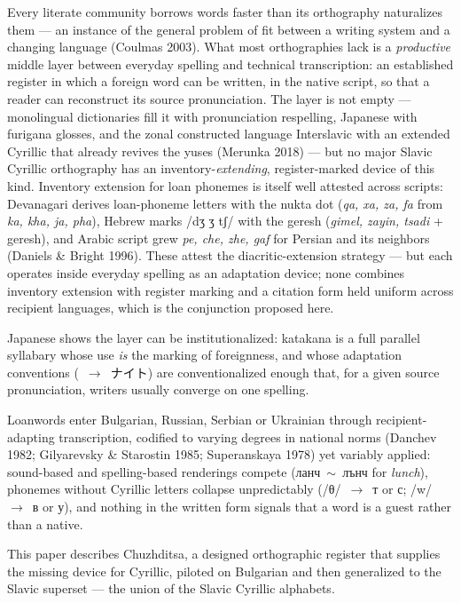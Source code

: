 \documentclass[11pt]{article}
\newcommand{\cz}[1]{{\chu #1}}
\newcommand{\ph}[1]{{\ipafont/#1/}}
\newcommand{\phon}[1]{{\ipafont[#1]}}
\newcommand{\src}[1]{{\ipafont #1}}
\begin{document}
Every literate community borrows words faster than its orthography naturalizes them — an instance of the general problem of fit between a writing system and a changing language (Coulmas 2003). What most orthographies lack is a \emph{productive} middle layer between everyday spelling and technical transcription: an established register in which a foreign word can be written, in the native script, so that a reader can reconstruct its source pronunciation. The layer is not empty — monolingual dictionaries fill it with pronunciation respelling, Japanese with furigana glosses, and the zonal constructed language Interslavic with an extended Cyrillic that already revives the yuses (Merunka 2018) — but no major Slavic Cyrillic orthography has an inventory-\emph{extending}, register-marked device of this kind. Inventory extension for loan phonemes is itself well attested across scripts: Devanagari derives loan-phoneme letters with the nukta dot (\emph{qa, xa, za, fa} from \emph{ka, kha, ja, pha}), Hebrew marks \ph{dʒ ʒ tʃ} with the geresh (\emph{gimel, zayin, tsadi} + geresh), and Arabic script grew \emph{pe, che, zhe, gaf} for Persian and its neighbors (Daniels \& Bright 1996). These attest the diacritic-extension strategy — but each operates inside everyday spelling as an adaptation device; none combines inventory extension with register marking and a citation form held uniform across recipient languages, which is the conjunction proposed here.

Japanese shows the layer can be institutionalized: katakana is a full parallel syllabary whose use \emph{is} the marking of foreignness, and whose adaptation conventions (\phon{naɪt}~$\rightarrow$~\src{ナイト}) are conventionalized enough that, for a given source pronunciation, writers usually converge on one spelling.

Loanwords enter Bulgarian, Russian, Serbian or Ukrainian through recipient-adapting transcription, codified to varying degrees in national norms (Danchev 1982; Gilyarevsky \& Starostin 1985; Superanskaya 1978) yet variably applied: sound-based and spelling-based renderings compete (\cz{ланч}~$\sim$~\cz{лънч} for \emph{lunch}), phonemes without Cyrillic letters collapse unpredictably (\ph{θ}~$\rightarrow$~т or с; \ph{w}~$\rightarrow$~в or у), and nothing in the written form signals that a word is a guest rather than a native.

This paper describes Chuzhditsa, a designed orthographic register that supplies the missing device for Cyrillic, piloted on Bulgarian and then generalized to the Slavic superset — the union of the Slavic Cyrillic alphabets.
\end{document}
